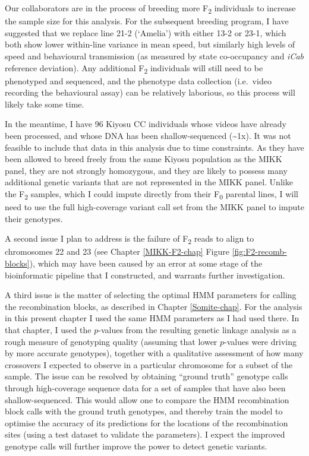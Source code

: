 \documentclass[
]{book}
\begin{document}
Our collaborators are in the process of breeding more F\textsubscript{2} individuals to increase the sample size for this analysis. For the subsequent breeding program, I have suggested that we replace line \textcolor{21-2 (‘Amelia’)_49B500}{21-2 (‘Amelia’)} with either \textcolor{13-2_F57A5F}{13-2} or \textcolor{23-1_AFA200}{23-1}, which both show lower within-line variance in mean speed, but similarly high levels of speed and behavioural transmission (as measured by state co-occupancy and \emph{\textcolor{iCab_424B4D}{iCab}} reference deviation). Any additional F\textsubscript{2} individuals will still need to be phenotyped and sequenced, and the phenotype data collection (i.e.~video recording the behavioural assay) can be relatively laborious, so this process will likely take some time.

In the meantime, I have 96 Kiyosu CC individuals whose videos have already been processed, and whose DNA has been shallow-sequenced (\textasciitilde1x). It was not feasible to include that data in this analysis due to time constraints. As they have been allowed to breed freely from the same Kiyosu population as the MIKK panel, they are not strongly homozygous, and they are likely to possess many additional genetic variants that are not represented in the MIKK panel. Unlike the F\textsubscript{2} samples, which I could impute directly from their F\textsubscript{0} parental lines, I will need to use the full high-coverage variant call set from the MIKK panel to impute their genotypes.

A second issue I plan to address is the failure of F\textsubscript{2} reads to align to chromosomes 22 and 23 (see Chapter \ref{MIKK-F2-chap} Figure \ref{fig:F2-recomb-blocks}), which may have been caused by an error at some stage of the bioinformatic pipeline that I constructed, and warrants further investigation.

A third issue is the matter of selecting the optimal HMM parameters for calling the recombination blocks, as described in Chapter \ref{Somite-chap}. For the analysis in this present chapter I used the same HMM parameters as I had used there. In that chapter, I used the \(p\)-values from the resulting genetic linkage analysis as a rough measure of genotyping quality (assuming that lower \(p\)-values were driving by more accurate genotypes), together with a qualitative assessment of how many crossovers I expected to observe in a particular chromosome for a subset of the sample. The issue can be resolved by obtaining ``ground truth'' genotype calls through high-coverage sequence data for a set of samples that have also been shallow-sequenced. This would allow one to compare the HMM recombination block calls with the ground truth genotypes, and thereby train the model to optimise the accuracy of its predictions for the locations of the recombination sites (using a test dataset to validate the parameters). I expect the improved genotype calls will further improve the power to detect genetic variants.
\end{document}
